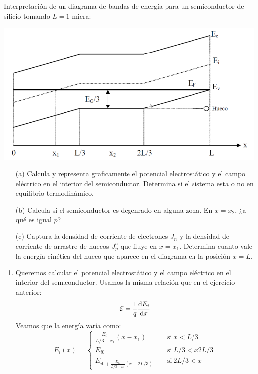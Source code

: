 \begin{texercise}
	Interpretación de un diagrama de bandas de energía para un semiconductor de silicio tomando $L=1$ micra:
	\begin{center}
		\includegraphics[width=0.7\linewidth]{Cuerpo/Ch_02/02_Ejercicio_16.png}		
	\end{center}
	\begin{itemize}
		\item[(a)] Calcula y representa graficamente el potencial electrostático y el campo eléctrico en el interior del semiconductor. Determina si el sistema esta o no en equilibrio termodinámico.
		\item[(b)] Calcula si el semiconductor es degenrado en alguna zona. En $x=x_2$, ¿a qué es igual $p$?
		\item[(c)] Captura la densidad de corriente de electrones $J_n$ y la densidad de corriente de arrastre de huecos $J_p^a$ que fluye en $x=x_1$. Determina cuanto vale la energía cinética del hueco que aparece en el diagrama en la posición $x=L$. 
	\end{itemize}
	\tcblower
	\begin{enumerate}[label=\alph*)]
		\item Queremos calcular el potencial electrostático y el campo eléctrico en el interior del semiconductor. Usamos la misma relación que en el ejercicio anterior:
		\begin{equation}
			\mathcal{E} = \frac{1}{q} \frac{\mathrm{d} E_i}{\mathrm{d} x}
		\end{equation}
		Veamos que la energía varía como:
		\begin{equation}
			E_i(x) = \left\lbrace \begin{array}{ll}
				\frac{E_{i0}}{L/3-x_1} (x-x_1) \quad & \ \text{si} \ x<L/3 \\
				E_{i0} \quad & \ \text{si} \ L/3<x2L/3 \\
				E_{i0+\frac{E_{i0}}{L/3-x_1} (x-2L/3)} \quad & \ \text{si} \ 2L/3<x
			\end{array} \right.
		\end{equation}

\end{enumerate}
\end{texercise}
